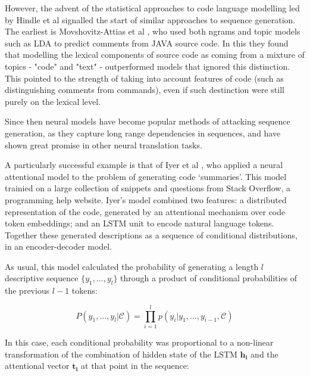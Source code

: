 However, the advent of the statistical approaches to code language modelling led by Hindle et al \cite{Hindle:2012:NS:2337223.2337322} signalled the start of similar approaches to sequence generation. The earliest is Movshovitz-Attias et al \cite{movshovitz-attias_natural_nodate}, who used both ngrams and topic models such as LDA to predict comments from JAVA source code. In this they found that modelling the lexical components of source code as coming from a mixture of topics - "code" and "text" - outperformed models that ignored this distinction.  This pointed to the strength of taking into account features of code (such as distinguishing comments from commands), even if such destinction were still purely on the lexical level.

Since then neural models have become popular methods of attacking sequence generation, as they capture long range dependencies in sequences, and have shown great promise in other neural translation tasks.

A particularly successful example is that of Iyer et al \cite{iyer_summarizing_2016}, who applied a neural attentional model to the problem of generating code `summaries'. This model trainied on a large collection of snippets and questions from Stack Overflow, a programming help website.   Iyer's model combined two features: a distributed representation of the code, generated by an attentional mechanism \cite{luong_effective_2015} over code token embeddings; and an LSTM unit \cite{hochreiter_long_1997} to encode natural language tokens. Together these generated descriptions as a sequence of conditional distributions, in an encoder-decoder model. 

As usual, this model calculated the probability of generating a length $l$
descriptive sequence $\{y_1,...,y_l\}$ through a product of conditional probabilities of the previous $l-1$ tokens:

$$P(y_1,...,y_l| \mathcal{C}) = \prod_{i=1}^lp(y_i | y_1, ..., y_{i-1}, \mathcal{C} ) $$

In this case, each conditional probability was proportional to a non-linear transformation of the combination of hidden state of the LSTM $\mathbf{h_i}$ and the attentional vector  $\mathbf{t_i}$ at that point in the sequence: 

